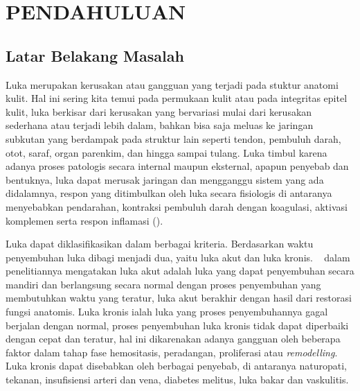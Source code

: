 
\chapter{PENDAHULUAN}

\section{Latar Belakang Masalah}

Luka merupakan kerusakan atau gangguan  yang terjadi pada stuktur anatomi kulit. 
Hal ini sering kita temui pada permukaan kulit atau pada integritas epitel kulit,
luka berkisar dari kerusakan yang bervariasi mulai dari kerusakan sederhana atau
terjadi lebih dalam, bahkan bisa saja meluas ke jaringan subkutan yang berdampak 
pada struktur lain seperti tendon, pembuluh darah, otot, saraf, organ parenkim, dan 
hingga sampai tulang. Luka timbul karena adanya proses patologis secara internal 
maupun eksternal, apapun penyebab dan bentuknya, luka dapat merusak jaringan dan 
mengganggu sistem yang ada didalamnya, respon yang ditimbulkan oleh luka secara 
fisiologis di antaranya menyebabkan pendarahan, kontraksi pembuluh darah dengan 
koagulasi, aktivasi komplemen serta respon inflamasi (\cite{Velnar:2009}).


Luka dapat diklasifikasikan dalam berbagai kriteria. Berdasarkan waktu penyembuhan 
luka dibagi menjadi dua, yaitu luka akut dan luka kronis. ~\cite{Velnar:2009} dalam 
penelitiannya mengatakan luka akut adalah luka yang dapat penyembuhan secara mandiri 
dan berlangsung secara normal dengan proses penyembuhan yang membutuhkan waktu yang 
teratur, luka akut berakhir dengan hasil dari restorasi fungsi anatomis. 
Luka kronis ialah luka yang proses penyembuhannya gagal berjalan dengan normal, 
proses penyembuhan luka kronis tidak dapat diperbaiki dengan cepat dan teratur, 
hal ini dikarenakan adanya gangguan oleh beberapa faktor dalam tahap fase hemositasis, 
peradangan, proliferasi atau \emph{remodelling}. Luka kronis dapat disebabkan oleh berbagai 
penyebab, di antaranya naturopati, tekanan, insufisiensi arteri dan vena, diabetes melitus, 
luka bakar dan vaskulitis.


